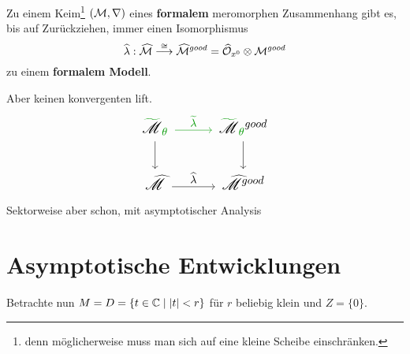 \begin{paracol}{2}
  \begin{tthm}
    Zu einem Keim\footnote{denn möglicherweise muss man sich auf eine kleine
    Scheibe einschränken.} $(\mathcal{M},\nabla)$ eines \textbf{formalem} meromorphen
    Zusammenhang gibt es, bis auf Zurückziehen, immer einen Isomorphismus
    \[
      \widehat\lambda:\widehat{\mathcal{M}}
      \overset{\cong}\longrightarrow
      \widehat{\mathcal{M}}^{good}
      =\widehat{\mathcal{O}}_{x^0}\otimes\mathcal{M}^{good}
    \]
    zu einem \textbf{formalem Modell}.
  \end{tthm}
\switchcolumn
  \begin{rem}
    Aber keinen konvergenten lift.
    \[ \Large\begin{tikzcd}
        \textcolor{green!60!black}{\tilde{\textcolor{black}{\sM}}_{\theta}}\dar
        \rar[green!60!black]{\tilde\lambda}&
        \textcolor{green!60!black}{%
          \tilde{\textcolor{black}{\sM}}_{\theta}}^{good} \dar
        \\\hat\sM \rar{\hat\lambda} &
          \hat\sM^{good}
    \end{tikzcd} \]
    \textcolor{green!60!black}{Sektorweise aber schon, mit asymptotischer
    Analysis}
  \end{rem}
\end{paracol}
\pagebreak \section{Asymptotische Entwicklungen} %
Betrachte nun $M=D=\{t\in\mathbb{C}\mid|t|<r\}$ für $r$ beliebig klein und $Z=\{0\}$.
